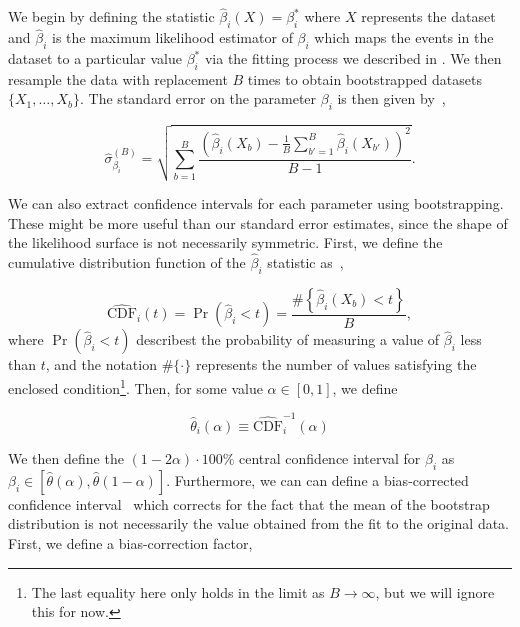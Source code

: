 We begin by defining the statistic $\hat{\beta}_i(X) = \beta_i^*$ where $X$ represents the dataset and $\hat{\beta}_i$ is the maximum likelihood estimator of $\beta_i$ which maps the events in the dataset to a particular value $\beta_i^*$ via the fitting process we described in . We then resample the data with replacement $B$ times to obtain bootstrapped datasets $\{X_1,\ldots,X_b\}$. The standard error on the parameter $\beta_i$ is then given by~\cite{Efron1981},

\begin{equation}
  \hat{\sigma}_{\beta_i}^{(B)} = \sqrt{\sum_{b=1}^{B}\frac{\left(\hat{\beta}_i(X_b) - \frac{1}{B}\sum_{b'=1}^{B} \hat{\beta}_i(X_{b'}) \right)^2}{B-1}}.
  \label{eq:bootstrap-standard-error}
\end{equation}

We can also extract confidence intervals for each parameter using bootstrapping. These might be more useful than our standard error estimates, since the shape of the likelihood surface is not necessarily symmetric. First, we define the cumulative distribution function of the $\hat{\beta}_i$ statistic as~\cite{Efron1981},

\begin{equation}
  \hat{\text{CDF}}_i(t) = \Pr(\hat{\beta}_i < t) = \frac{\#\left\{\hat{\beta}_i(X_b) < t\right\}}{B},
\end{equation}
where $\Pr(\hat{\beta}_i < t)$ describest the probability of measuring a value of $\hat{\beta}_i$ less than $t$, and the notation $\#\{\cdot\}$ represents the number of values satisfying the enclosed condition\footnote{The last equality here only holds in the limit as $B\to\infty$, but we will ignore this for now.}. Then, for some value $\alpha \in [0, 1]$, we define

\begin{equation}
  \hat{\theta}_i(\alpha) \equiv \hat{\text{CDF}}_i^{-1}(\alpha)
\end{equation}

We then define the $(1 - 2\alpha)\cdot 100\%$ central confidence interval for $\beta_i$ as $\beta_i \in [\hat{\theta}(\alpha),\hat{\theta}(1 - \alpha)]$. Furthermore, we can can define a bias-corrected confidence interval~\cite{Efron1981} which corrects for the fact that the mean of the bootstrap distribution is not necessarily the value obtained from the fit to the original data. First, we define a bias-correction factor,

